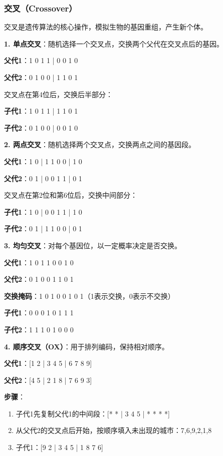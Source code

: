 \subsubsection{交叉（Crossover）}
交叉是遗传算法的核心操作，模拟生物的基因重组，产生新个体。

\textbf{1. 单点交叉}：随机选择一个交叉点，交换两个父代在交叉点后的基因。

\begin{examplebox}[例子：单点交叉]
\textbf{父代1}：1 0 1 1 | 0 0 1 0

\textbf{父代2}：0 1 0 0 | 1 1 0 1

交叉点在第4位后，交换后半部分：

\textbf{子代1}：1 0 1 1 | 1 1 0 1

\textbf{子代2}：0 1 0 0 | 0 0 1 0
\end{examplebox}

\textbf{2. 两点交叉}：随机选择两个交叉点，交换两点之间的基因段。

\begin{examplebox}[例子：两点交叉]
\textbf{父代1}：1 0 | 1 1 0 0 | 1 0

\textbf{父代2}：0 1 | 0 0 1 1 | 0 1

交叉点在第2位和第6位后，交换中间部分：

\textbf{子代1}：1 0 | 0 0 1 1 | 1 0

\textbf{子代2}：0 1 | 1 1 0 0 | 0 1
\end{examplebox}

\textbf{3. 均匀交叉}：对每个基因位，以一定概率决定是否交换。

\begin{examplebox}[例子：均匀交叉]
\textbf{父代1}：1 0 1 1 0 0 1 0

\textbf{父代2}：0 1 0 0 1 1 0 1

\textbf{交换掩码}：1 0 1 0 0 1 0 1（1表示交换，0表示不交换）

\textbf{子代1}：0 0 0 1 0 1 1 1

\textbf{子代2}：1 1 1 0 1 0 0 0
\end{examplebox}

\textbf{4. 顺序交叉（OX）}：用于排列编码，保持相对顺序。

\begin{examplebox}
\textbf{父代1}：[1 2 | 3 4 5 | 6 7 8 9]

\textbf{父代2}：[4 5 | 2 1 8 | 7 6 9 3]

\textbf{步骤}：
\begin{enumerate}[itemsep=0pt]
    \item 子代1先复制父代1的中间段：[* * | 3 4 5 | * * * *]
    \item 从父代2的交叉点后开始，按顺序填入未出现的城市：7,6,9,2,1,8
    \item 子代1：[9 2 | 3 4 5 | 1 8 7 6]
\end{enumerate}
\end{examplebox}

